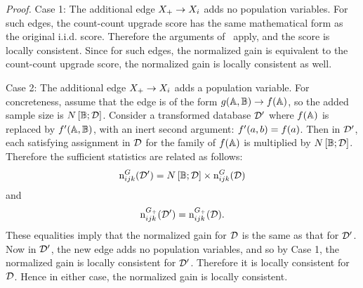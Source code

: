 \documentclass[letterpaper]{article}
\begin{document}
{\em Proof.} Case 1: The additional edge $X_{+} \rightarrow X_{i}$ adds no population variables. For such edges, the count-count upgrade score  has the same mathematical form as the original i.i.d. score. Therefore the arguments of~\cite{Chickering2003} apply, and the score is locally consistent. Since for such edges, the normalized gain is equivalent to the count-count upgrade score, 
the normalized gain is locally consistent as well. 

Case 2: The additional edge $X_{+} \rightarrow X_{i}$ adds a population variable. For concreteness, assume that the edge is of the form $g(\mathbb{A},\mathbb{B}) \rightarrow f(\mathbb{A})$, so the added sample size is $N\left[\mathbb{B};\mathcal{D}\right]$. Consider a transformed database $\mathcal{D}'$ where $f(\mathbb{A})$ is replaced by $f'(\mathbb{A},\mathbb{B})$, with an inert second argument: $f'(a,b) = f(a)$. Then in $\mathcal{D}'$, each satisfying assignment in $\mathcal{D}$ for the family of $f(\mathbb{A})$  is multiplied by $N\left[\mathbb{B};\mathcal{D}\right]$. Therefore the sufficient statistics are related as follows: 
$$\mathrm{n}^{G}_{ijk}(\mathcal{D}') = 
N\left[\mathbb{B};\mathcal{D}\right] \times\mathrm{n}^{G}_{ijk}(\mathcal{D})$$ and $$\mathrm{n}^{G_{+}}_{ijk}(\mathcal{D}') = 
\mathrm{n}^{G_{+}}_{ijk}(\mathcal{D}).$$ These equalities imply that the normalized gain for $\mathcal{D}$ is the same as that for $\mathcal{D}'$. Now in $\mathcal{D}'$, the new edge adds no population variables, and so by Case 1, the normalized gain is locally consistent for $\mathcal{D}'$. Therefore it is locally consistent for $\mathcal{D}$. Hence in either case, the normalized gain is locally consistent.



\end{document}
